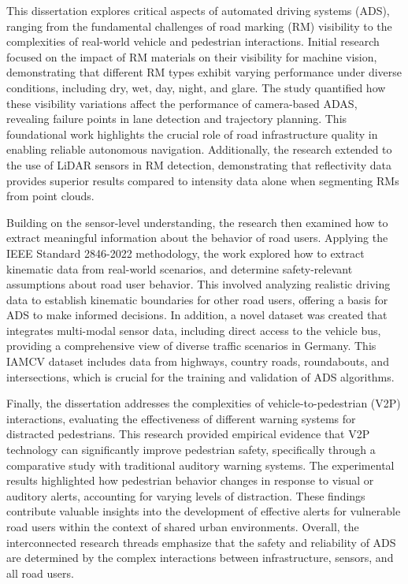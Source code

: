 \documentclass[a4paper,oneside,10pt,ngerman,english]{scrartcl}
\begin{document}
This dissertation explores critical aspects of automated driving systems (ADS), ranging from the fundamental challenges of road marking (RM) visibility to the complexities of real-world vehicle and pedestrian interactions. Initial research focused on the impact of RM materials on their visibility for machine vision, demonstrating that different RM types exhibit varying performance under diverse conditions, including dry, wet, day, night, and glare. The study quantified how these visibility variations affect the performance of camera-based ADAS, revealing failure points in lane detection and trajectory planning. This foundational work highlights the crucial role of road infrastructure quality in enabling reliable autonomous navigation. Additionally, the research extended to the use of LiDAR sensors in RM detection, demonstrating that reflectivity data provides superior results compared to intensity data alone when segmenting RMs from point clouds.

Building on the sensor-level understanding, the research then examined how to extract meaningful information about the behavior of road users. Applying the IEEE Standard 2846-2022 methodology, the work explored how to extract kinematic data from real-world scenarios, and determine safety-relevant assumptions about road user behavior. This involved analyzing realistic driving data to establish kinematic boundaries for other road users, offering a basis for ADS to make informed decisions. In addition, a novel dataset was created that integrates multi-modal sensor data, including direct access to the vehicle bus, providing a comprehensive view of diverse traffic scenarios in Germany. This IAMCV dataset includes data from highways, country roads, roundabouts, and intersections, which is crucial for the training and validation of ADS algorithms.

Finally, the dissertation addresses the complexities of vehicle-to-pedestrian (V2P) interactions, evaluating the effectiveness of different warning systems for distracted pedestrians. This research provided empirical evidence that V2P technology can significantly improve pedestrian safety, specifically through a comparative study with traditional auditory warning systems. The experimental results highlighted how pedestrian behavior changes in response to visual or auditory alerts, accounting for varying levels of distraction. These findings contribute valuable insights into the development of effective alerts for vulnerable road users within the context of shared urban environments. Overall, the interconnected research threads emphasize that the safety and reliability of ADS are determined by the complex interactions between infrastructure, sensors, and all road users.
\end{document}

